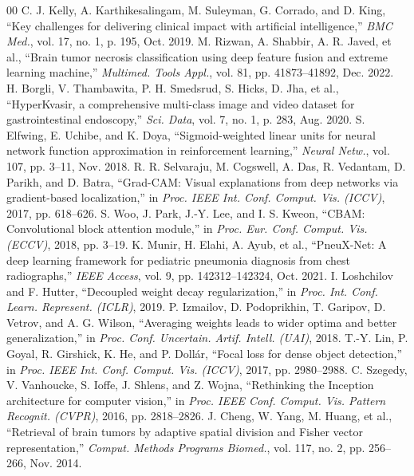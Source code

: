 \documentclass[conference]{IEEEtran}
\begin{document}
\begin{thebibliography}{00}
 C. J. Kelly, A. Karthikesalingam, M. Suleyman, G. Corrado, and D. King, ``Key challenges for delivering clinical impact with artificial intelligence,'' \emph{BMC Med.}, vol. 17, no. 1, p. 195, Oct. 2019.
 M. Rizwan, A. Shabbir, A. R. Javed, et al., ``Brain tumor necrosis classification using deep feature fusion and extreme learning machine,'' \emph{Multimed. Tools Appl.}, vol. 81, pp. 41873--41892, Dec. 2022.
 H. Borgli, V. Thambawita, P. H. Smedsrud, S. Hicks, D. Jha, et al., ``HyperKvasir, a comprehensive multi-class image and video dataset for gastrointestinal endoscopy,'' \emph{Sci. Data}, vol. 7, no. 1, p. 283, Aug. 2020.
 S. Elfwing, E. Uchibe, and K. Doya, ``Sigmoid-weighted linear units for neural network function approximation in reinforcement learning,'' \emph{Neural Netw.}, vol. 107, pp. 3--11, Nov. 2018.
 R. R. Selvaraju, M. Cogswell, A. Das, R. Vedantam, D. Parikh, and D. Batra, ``Grad-CAM: Visual explanations from deep networks via gradient-based localization,'' in \emph{Proc. IEEE Int. Conf. Comput. Vis. (ICCV)}, 2017, pp. 618--626.
 S. Woo, J. Park, J.-Y. Lee, and I. S. Kweon, ``CBAM: Convolutional block attention module,'' in \emph{Proc. Eur. Conf. Comput. Vis. (ECCV)}, 2018, pp. 3--19.
 K. Munir, H. Elahi, A. Ayub, et al., ``PneuX-Net: A deep learning framework for pediatric pneumonia diagnosis from chest radiographs,'' \emph{IEEE Access}, vol. 9, pp. 142312--142324, Oct. 2021.
 I. Loshchilov and F. Hutter, ``Decoupled weight decay regularization,'' in \emph{Proc. Int. Conf. Learn. Represent. (ICLR)}, 2019.
 P. Izmailov, D. Podoprikhin, T. Garipov, D. Vetrov, and A. G. Wilson, ``Averaging weights leads to wider optima and better generalization,'' in \emph{Proc. Conf. Uncertain. Artif. Intell. (UAI)}, 2018.
 T.-Y. Lin, P. Goyal, R. Girshick, K. He, and P. Doll{\'a}r, ``Focal loss for dense object detection,'' in \emph{Proc. IEEE Int. Conf. Comput. Vis. (ICCV)}, 2017, pp. 2980--2988.
 C. Szegedy, V. Vanhoucke, S. Ioffe, J. Shlens, and Z. Wojna, ``Rethinking the Inception architecture for computer vision,'' in \emph{Proc. IEEE Conf. Comput. Vis. Pattern Recognit. (CVPR)}, 2016, pp. 2818--2826.
 J. Cheng, W. Yang, M. Huang, et al., ``Retrieval of brain tumors by adaptive spatial division and Fisher vector representation,'' \emph{Comput. Methods Programs Biomed.}, vol. 117, no. 2, pp. 256--266, Nov. 2014.

\end{thebibliography}
\end{document}

